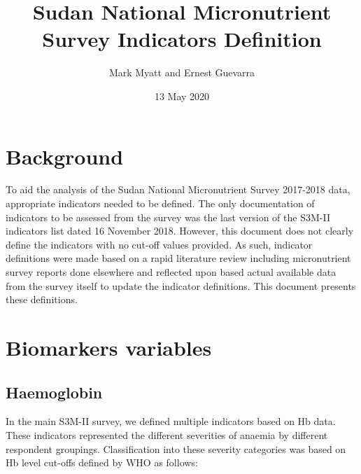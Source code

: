 \documentclass[12pt,a4paper]{article}
\title{Sudan National Micronutrient Survey Indicators Definition}
\author{Mark Myatt and Ernest Guevarra}
\date{13 May 2020}
\begin{document}
\maketitle

{
\hypersetup{linkcolor=}
\setcounter{tocdepth}{2}
\tableofcontents
}
\newpage

\hypertarget{background}{%
\section{Background}\label{background}}

To aid the analysis of the Sudan National Micronutrient Survey 2017-2018 data, appropriate indicators needed to be defined. The only documentation of indicators to be assessed from the survey was the last version of the S3M-II indicators list dated 16 November 2018. However, this document does not clearly define the indicators with no cut-off values provided. As such, indicator definitions were made based on a rapid literature review including micronutrient survey reports done elsewhere and reflected upon based actual available data from the survey itself to update the indicator definitions. This document presents these definitions.

\hypertarget{biomarkers-variables}{%
\section{Biomarkers variables}\label{biomarkers-variables}}

\hypertarget{haemoglobin}{%
\subsection{Haemoglobin}\label{haemoglobin}}

In the main S3M-II survey, we defined multiple indicators based on Hb data. These indicators represented the different severities of anaemia by different respondent groupings. Classification into these severity categories was based on Hb level cut-offs defined by WHO \citep{WorldHealthOrganization:2007tx, WorldHealthOrganization:2011ut} as follows:
\end{document}
